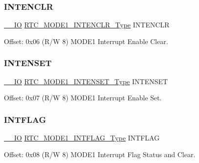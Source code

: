 \mbox{\label{struct_rtc_mode1_a8db76753ed9b826cdbd18a33586df2ca}} 
\subsubsection{\texorpdfstring{INTENCLR}{INTENCLR}}
{\footnotesize\ttfamily \mbox{\hyperlink{core__cm0plus_8h_aec43007d9998a0a0e01faede4133d6be}{\+\_\+\+\_\+\+IO}} \mbox{\hyperlink{union_r_t_c___m_o_d_e1___i_n_t_e_n_c_l_r___type}{R\+T\+C\+\_\+\+M\+O\+D\+E1\+\_\+\+I\+N\+T\+E\+N\+C\+L\+R\+\_\+\+Type}} I\+N\+T\+E\+N\+C\+LR}



Offset\+: 0x06 (R/W 8) M\+O\+D\+E1 Interrupt Enable Clear. 

\mbox{\label{struct_rtc_mode1_a3c738715c84f2e64ffdb4e522423fc2b}} 
\subsubsection{\texorpdfstring{INTENSET}{INTENSET}}
{\footnotesize\ttfamily \mbox{\hyperlink{core__cm0plus_8h_aec43007d9998a0a0e01faede4133d6be}{\+\_\+\+\_\+\+IO}} \mbox{\hyperlink{union_r_t_c___m_o_d_e1___i_n_t_e_n_s_e_t___type}{R\+T\+C\+\_\+\+M\+O\+D\+E1\+\_\+\+I\+N\+T\+E\+N\+S\+E\+T\+\_\+\+Type}} I\+N\+T\+E\+N\+S\+ET}



Offset\+: 0x07 (R/W 8) M\+O\+D\+E1 Interrupt Enable Set. 

\mbox{\label{struct_rtc_mode1_ad4ea2caf2becf706915e27b1b952effd}} 
\subsubsection{\texorpdfstring{INTFLAG}{INTFLAG}}
{\footnotesize\ttfamily \mbox{\hyperlink{core__cm0plus_8h_aec43007d9998a0a0e01faede4133d6be}{\+\_\+\+\_\+\+IO}} \mbox{\hyperlink{union_r_t_c___m_o_d_e1___i_n_t_f_l_a_g___type}{R\+T\+C\+\_\+\+M\+O\+D\+E1\+\_\+\+I\+N\+T\+F\+L\+A\+G\+\_\+\+Type}} I\+N\+T\+F\+L\+AG}



Offset\+: 0x08 (R/W 8) M\+O\+D\+E1 Interrupt Flag Status and Clear. 

